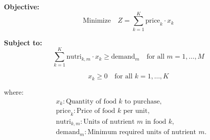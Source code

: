 \documentclass{article}
\begin{document}
\textbf{Objective:}
\[
\text{Minimize} \quad Z = \sum_{k=1}^{K} \text{price}_k \cdot x_k
\]

\textbf{Subject to:}
\[
\sum_{k=1}^{K} \text{nutri}_{k, m} \cdot x_k \geq \text{demand}_m \quad \text{for all } m = 1, \ldots, M
\]

\[
x_k \geq 0 \quad \text{for all } k = 1, \ldots, K
\]

where:
\begin{align*}
& x_k: \text{Quantity of food } k \text{ to purchase}, \\
& \text{price}_k: \text{Price of food } k \text{ per unit}, \\
& \text{nutri}_{k, m}: \text{Units of nutrient } m \text{ in food } k, \\
& \text{demand}_m: \text{Minimum required units of nutrient } m.
\end{align*}
\end{document}
